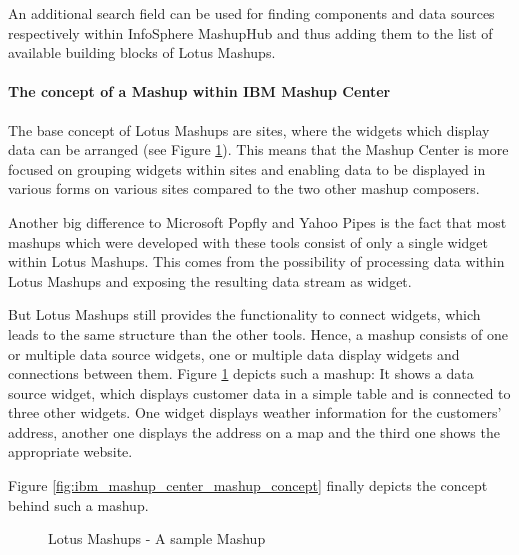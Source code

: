 An additional search field can be used for finding components and data sources
respectively within InfoSphere MashupHub and thus adding them to the list of
available building blocks of Lotus Mashups.

\paragraph{The concept of a Mashup within IBM Mashup Center}
The base concept of Lotus Mashups are sites, where the widgets which display data can be arranged
(see Figure \ref{fig:ibm_mashup_center_mashups}). This means that the Mashup Center is more focused
on grouping widgets within sites and enabling data to be displayed in various forms on various sites
compared to the two other mashup composers.

Another big difference to Microsoft Popfly and Yahoo Pipes is the fact that
most mashups which were developed with these tools consist of only a single
widget within Lotus Mashups. This comes from the possibility of processing
data within Lotus Mashups and exposing the resulting data stream as widget.

But Lotus Mashups still provides the functionality to connect widgets, which
leads to the same structure than the other tools. Hence, a mashup consists of one or multiple
data source widgets, one or multiple data display widgets and connections between
them. Figure \ref{fig:ibm_mashup_center_mashups} depicts such a mashup: It
shows a data source widget, which displays customer data in a simple table and
is connected to three other widgets. One widget displays weather information
for the customers' address, another one displays the address on a map and the
third one shows the appropriate website.

Figure \ref{fig:ibm_mashup_center_mashup_concept} finally depicts the concept
behind such a mashup.

\begin{figure}
	\centering
	\caption{Lotus Mashups - A sample Mashup}
	\label{fig:ibm_mashup_center_mashups}
\end{figure}


